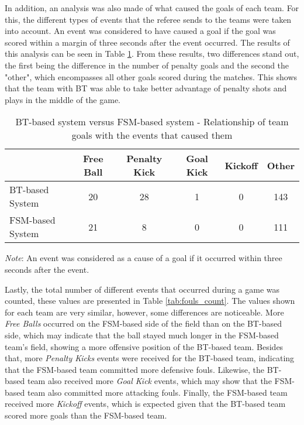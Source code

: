 In addition, an analysis was also made of what caused the goals of each team. For this, the different types of events that the referee sends to the teams were taken into account. An event was considered to have caused a goal if the goal was scored within a margin of three seconds after the event occurred. The results of this analysis can be seen in Table \ref{tab:goals_reasons}. From these results, two differences stand out, the first being the difference in the number of penalty goals and the second the "other", which encompasses all other goals scored during the matches. This shows that the team with BT was able to take better advantage of penalty shots and plays in the middle of the game.

\begin{table}[h]
    \begin{minipage}{\columnwidth}
        \centering
        \begin{tabular}{l c c c c c}
            \toprule
                             & Free Ball & Penalty Kick & Goal Kick & Kickoff & Other \\
            \midrule
            BT-based System  & 20        & 28           & 1         & 0       & 143   \\
            FSM-based System & 21        & 8            & 0         & 0       & 111   \\
            \bottomrule
        \end{tabular}
        \begin{center}
            \footnotesize
            \emph{Note}: An event was considered as a cause of a goal if it occurred within three seconds after the event.
        \end{center}
    \end{minipage}
    \caption{BT-based system versus FSM-based system - Relationship of team goals with the events that caused them}
    \label{tab:goals_reasons}
\end{table}

Lastly, the total number of different events that occurred during a game was counted, these values are presented in Table \ref{tab:fouls_count}. The values shown for each team are very similar, however, some differences are noticeable. More \textit{Free Balls} occurred on the FSM-based side of the field than on the BT-based side, which may indicate that the ball stayed much longer in the FSM-based team's field, showing a more offensive position of the BT-based team. Besides that, more \textit{Penalty Kicks} events were received for the BT-based team, indicating that the FSM-based team committed more defensive fouls. Likewise, the BT-based team also received more \textit{Goal Kick} events, which may show that the FSM-based team also committed more attacking fouls. Finally, the FSM-based team received more \textit{Kickoff} events, which is expected given that the BT-based team scored more goals than the FSM-based team.

